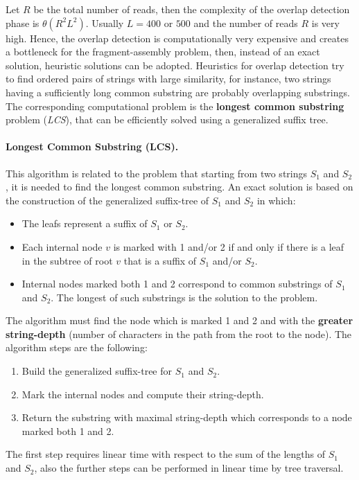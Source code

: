 Let $R$ be the total number of reads, then the complexity of the overlap detection phase is $\theta(R^2L^2)$. Usually $L=400\text{ or }500$ and the number of reads $R$ is very high. Hence, the overlap detection is computationally very expensive and creates a bottleneck for the fragment-assembly problem, then, instead of an exact solution, heuristic solutions can be adopted. Heuristics for overlap detection try to find ordered pairs of strings with large similarity, for instance, two strings having a sufficiently long common substring are probably overlapping substrings. The corresponding computational problem is the \textbf{longest common substring} problem (\textit{LCS}), that can be efficiently solved using a generalized suffix tree.

\paragraph*{Longest Common Substring (LCS).} This algorithm is related to the problem that starting from two strings $S_1$ and $S_2$, it is needed to find the longest common substring. An exact solution is based on the construction of the generalized suffix-tree of $S_1$ and $S_2$ in which:
\begin{itemize}
	\item The leafs represent a suffix of $S_1$ or $S_2$.
	\item Each internal node $v$ is marked with 1 and/or 2 if and only if there is a leaf in the subtree of root $v$ that is a suffix of $S_1$ and/or $S_2$.
	\item Internal nodes marked both 1 and 2 correspond to common substrings of $S_1$ and $S_2$. The longest of such substrings is the solution to the problem.
\end{itemize}
The algorithm must find the node which is marked 1 and 2 and with the \textbf{greater string-depth} (number of characters in the path from the root to the node). The algorithm steps are the following:
\begin{enumerate}
	\item Build the generalized suffix-tree for $S_1$ and $S_2$.
	\item Mark the internal nodes and compute their string-depth.
	\item Return the substring with maximal string-depth which corresponds to a node marked both 1 and 2.
\end{enumerate}
The first step requires linear time with respect to the sum of the lengths of $S_1$ and $S_2$, also the further steps can be performed in linear time by tree traversal.\\
